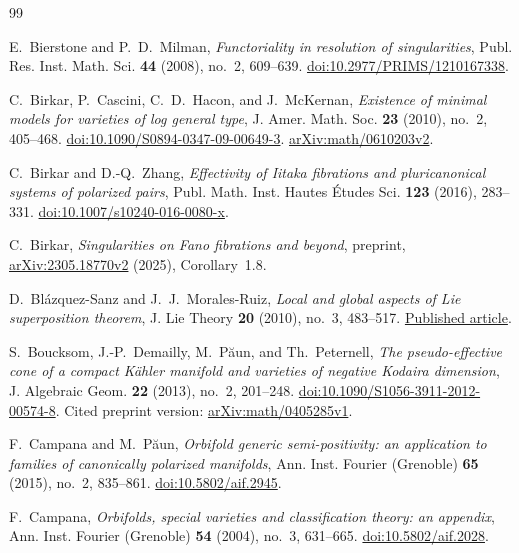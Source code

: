 \begin{thebibliography}{99}

E.~Bierstone and P.~D.~Milman,
\emph{Functoriality in resolution of singularities},
Publ. Res. Inst. Math. Sci. \textbf{44} (2008), no.~2, 609--639.
\href{https://doi.org/10.2977/PRIMS/1210167338}{doi:10.2977/PRIMS/1210167338}.

C.~Birkar, P.~Cascini, C.~D.~Hacon, and J.~McKernan,
\emph{Existence of minimal models for varieties of log general type},
J. Amer. Math. Soc. \textbf{23} (2010), no.~2, 405--468.
\href{https://doi.org/10.1090/S0894-0347-09-00649-3}{doi:10.1090/S0894-0347-09-00649-3}.
\href{https://arxiv.org/abs/math/0610203v2}{arXiv:math/0610203v2}.

C.~Birkar and D.-Q.~Zhang,
\emph{Effectivity of Iitaka fibrations and pluricanonical systems of polarized pairs},
Publ. Math. Inst. Hautes \'Etudes Sci. \textbf{123} (2016), 283--331.
\href{https://doi.org/10.1007/s10240-016-0080-x}{doi:10.1007/s10240-016-0080-x}.

C.~Birkar,
\emph{Singularities on Fano fibrations and beyond},
preprint, \href{https://arxiv.org/abs/2305.18770v2}{arXiv:2305.18770v2}
(2025), Corollary~1.8.

D.~Bl\'azquez-Sanz and J.~J.~Morales-Ruiz,
\emph{Local and global aspects of Lie superposition theorem},
J. Lie Theory \textbf{20} (2010), no.~3, 483--517.
\href{https://jolt.centre-mersenne.org/item/10.5802/jolt.606.pdf}{Published article}.

S.~Boucksom, J.-P.~Demailly, M.~P\u{a}un, and Th.~Peternell,
\emph{The pseudo-effective cone of a compact K\"ahler manifold and
varieties of negative Kodaira dimension},
J. Algebraic Geom. \textbf{22} (2013), no.~2, 201--248.
\href{https://doi.org/10.1090/S1056-3911-2012-00574-8}{doi:10.1090/S1056-3911-2012-00574-8}.
Cited preprint version:
\href{https://arxiv.org/abs/math/0405285v1}{arXiv:math/0405285v1}.

F.~Campana and M.~P\u{a}un,
\emph{Orbifold generic semi-positivity: an application to families of canonically polarized manifolds},
Ann. Inst. Fourier (Grenoble) \textbf{65} (2015), no.~2, 835--861.
\href{https://doi.org/10.5802/aif.2945}{doi:10.5802/aif.2945}.

F.~Campana,
\emph{Orbifolds, special varieties and classification theory: an appendix},
Ann. Inst. Fourier (Grenoble) \textbf{54} (2004), no.~3, 631--665.
\href{https://doi.org/10.5802/aif.2028}{doi:10.5802/aif.2028}.


\end{thebibliography}
